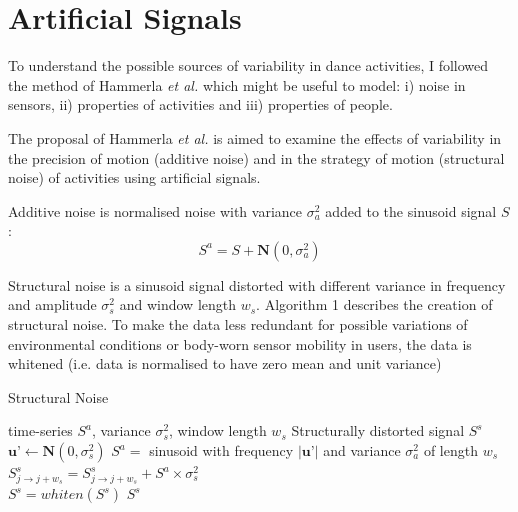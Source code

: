 \documentclass[10pt,journal,compsoc]{IEEEtran}
\begin{document}
\section{Artificial Signals}

To understand the possible sources of variability
in dance activities, I followed the method of Hammerla 
\emph{et al.} \cite{hammerla2011} which might be useful to model:
i) noise in sensors,
ii) properties of activities and 
iii) properties of people.

The proposal of Hammerla \emph{et al.} \cite{hammerla2011}
is aimed to examine the effects of
variability in the precision of motion  (additive noise) 
and in the strategy of motion  (structural noise) of 
activities using artificial signals.

Additive noise is normalised noise with variance $\sigma_a ^2$ added to the
sinusoid signal $S$: 
\begin{equation}
 S^a = S + \textbf{N}(0, \sigma_a ^2)
\end{equation} 

Structural noise is a sinusoid signal distorted with different variance 
in frequency and amplitude $\sigma_s ^2$ and window length $w_s$. 
Algorithm 1 describes the creation of structural noise.
To make the data less redundant for possible variations of environmental 
conditions or body-worn sensor mobility in users, the data is whitened 
(i.e. data is normalised to have zero mean and unit variance) 


\begin{algorithm}[H]
\caption{Structural Noise}
\begin{algorithmic}[1]
 \renewcommand{\algorithmicrequire}{\textbf{Input:}}
 \renewcommand{\algorithmicensure}{\textbf{Output:}}
 \REQUIRE time-series $S^a$, variance $\sigma_s ^2$, window length $w_s$
 \ENSURE  Structurally distorted signal $S^s$
  \STATE $\textbf{u'} \leftarrow \textbf{N}(0, \sigma_s ^2)$
  \STATE $S^{a} =$ sinusoid with frequency $| \textbf{u'} |$ and variance $\sigma_a ^2$ of length $w_s$
  \STATE $S^s_{j \rightarrow j+w_s}  = S^s_{j \rightarrow j+w_s}  + S^{a} \times   \sigma_s ^2 $
  \ENDFOR
  \\ $S^s= whiten (S^s)$
 \RETURN $S^s$
\end{algorithmic}
\end{algorithm}
\end{document}
